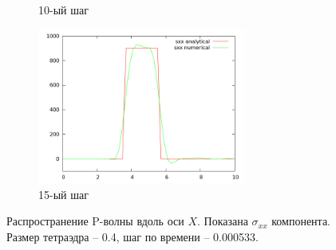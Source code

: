 \begin{figure}[H]
\begin{subfigure}[b]{0.5\textwidth}
\caption{10-ый шаг}
\end{subfigure}
\begin{subfigure}[b]{0.5\textwidth}
\centering
\includegraphics[width=0.75\textwidth]{png/veryfication/0.4/p-wave-along-x15.png}
\caption{15-ый шаг}
\end{subfigure}
\caption{Распространение P-волны вдоль оси $X$. Показана $\sigma_{xx}$ компонента. Размер тетраэдра -- 0.4, шаг по времени -- 0.000533. }
\label{pic:p_wave_along_x4}
\end{figure}

